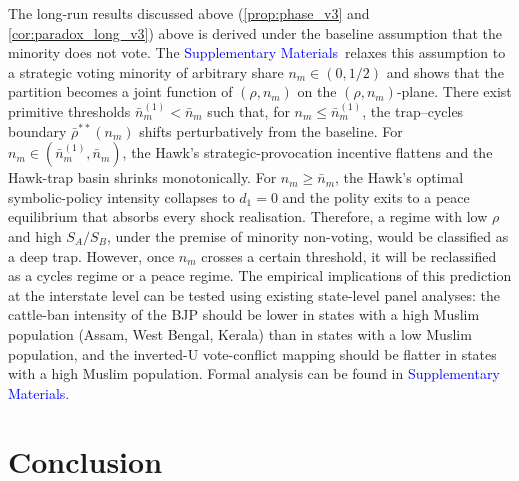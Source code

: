 \documentclass[11pt,twoside]{extarticle}
\newcommand{\suppmat}{\textcolor{blue}{Supplementary Materials}}
\begin{document}
The long-run results discussed above (\autoref{prop:phase_v3} and \autoref{cor:paradox_long_v3}) above is derived under the baseline assumption that the minority does not vote. The \suppmat~relaxes this assumption to a strategic voting minority of arbitrary share $n_m\in(0,1/2)$ and shows that the partition becomes a joint function of $(\rho,n_m)$ on the $(\rho,n_m)$-plane. 
There exist primitive thresholds $\bar n_m^{(1)}<\bar n_m$ such that, for $n_m\le\bar n_m^{(1)}$, the trap--cycles boundary $\bar\rho^{**}(n_m)$ shifts perturbatively from the baseline. 
For $n_m\in(\bar n_m^{(1)},\bar n_m)$, the Hawk's strategic-provocation incentive flattens and the Hawk-trap basin shrinks monotonically.
For $n_m\ge\bar n_m$, the Hawk's optimal symbolic-policy intensity collapses to $d_1=0$ and the polity exits to a peace equilibrium that absorbs every shock realisation. 
Therefore, a regime with low $\rho$ and high $S_A/S_B$, under the premise of minority non-voting, would be classified as a deep trap. However, once $n_m$ crosses a certain threshold, it will be reclassified as a cycles regime or a peace regime. The empirical implications of this prediction at the interstate level can be tested using existing state-level panel analyses: the cattle-ban intensity of the BJP should be lower in states with a high Muslim population (Assam, West Bengal, Kerala) than in states with a low Muslim population, and the inverted-U vote-conflict mapping should be flatter in states with a high Muslim population. Formal analysis can be found in \suppmat.

\section{Conclusion}\label{sec:conclusion_v3}
\end{document}
